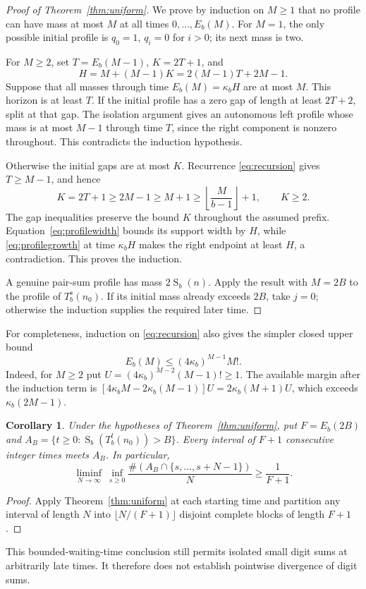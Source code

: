 \documentclass[11pt]{article}
\newtheorem{corollary}[theorem]{Corollary}
\newcommand{\ds}{\operatorname{S}}
\begin{document}
\begin{proof}[Proof of Theorem~\ref{thm:uniform}]
We prove by induction on $M\geq1$ that no profile can have mass at most
$M$ at all times $0,\ldots,E_b(M)$. For $M=1$, the only possible initial
profile is $q_0=1$, $q_i=0$ for $i>0$; its next mass is two.

For $M\geq2$, set $T=E_b(M-1)$, $K=2T+1$, and
\[
 H=M+(M-1)K=2(M-1)T+2M-1.
\]
Suppose that all masses through time $E_b(M)=\kappa_b H$ are at most
$M$. This horizon is at least $T$. If the initial profile has a zero gap
of length at least $2T+2$, split at that gap. The isolation argument gives
an autonomous left profile whose mass is at most $M-1$ through time $T$,
since the right component is nonzero throughout. This contradicts the
induction hypothesis.

Otherwise the initial gaps are at most $K$. Recurrence
\eqref{eq:recursion} gives $T\geq M-1$, and hence
\[
 K=2T+1\geq2M-1\geq M+1
       \geq\left\lfloor\frac M{b-1}\right\rfloor+1,
 \qquad K\geq2.
\]
The gap inequalities preserve the bound $K$ throughout the assumed
prefix. Equation~\eqref{eq:profilewidth} bounds its support width by
$H$, while \eqref{eq:profilegrowth} at time $\kappa_b H$ makes the
right endpoint at least $H$, a contradiction. This proves the induction.

A genuine pair-sum profile has mass $2\ds_b(n)$. Apply the result with
$M=2B$ to the profile of $T_b^s(n_0)$. If its initial mass already exceeds
$2B$, take $j=0$; otherwise the induction supplies the required later time.
\end{proof}

For completeness, induction on \eqref{eq:recursion} also gives the
simpler closed upper bound
\[
 E_b(M)\leq(4\kappa_b)^{M-1}M!.
\]
Indeed, for $M\geq2$ put $U=(4\kappa_b)^{M-2}(M-1)!\geq1$.
The available margin after the induction term is
$[4\kappa_b M-2\kappa_b(M-1)]U=2\kappa_b(M+1)U$,
which exceeds $\kappa_b(2M-1)$.

\begin{corollary}
Under the hypotheses of Theorem~\ref{thm:uniform}, put $F=E_b(2B)$ and
$A_B=\{t\geq0:\ds_b(T_b^t(n_0))>B\}$. Every interval of $F+1$
consecutive integer times meets $A_B$. In particular,
\[
 \liminf_{N\to\infty}\ \inf_{s\geq0}
 \frac{\#(A_B\cap\{s,\ldots,s+N-1\})}{N}
 \geq\frac1{F+1}.
\]
\end{corollary}
\begin{proof}
Apply Theorem~\ref{thm:uniform} at each starting time and partition any
interval of length $N$ into $\lfloor N/(F+1)\rfloor$ disjoint complete
blocks of length $F+1$.
\end{proof}
This bounded-waiting-time conclusion still permits isolated small digit
sums at arbitrarily late times. It therefore does not establish pointwise
divergence of digit sums.
\end{document}

